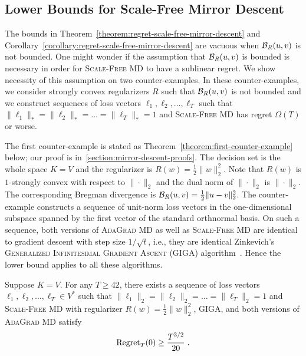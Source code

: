 \subsection{Lower Bounds for Scale-Free Mirror Descent}
\label{subsection:mirror-descent-lower-bound}

The bounds in Theorem~\ref{theorem:regret-scale-free-mirror-descent} and
Corollary~\ref{corollary:regret-scale-free-mirror-descent} are vacuous when
$\mathcal{B}_R(u,v)$ is not bounded. One might wonder if the assumption that
$\mathcal{B}_R(u,v)$ is bounded is necessary in order for \textsc{Scale-Free MD} to
have a sublinear regret. We show necessity of this assumption on two
counter-examples.  In these counter-examples, we consider strongly convex
regularizers $R$ such that $\mathcal{B}_R(u,v)$ is not bounded and we construct
sequences of loss vectors $\ell_1, \ell_2, \dots, \ell_T$ such that
$\|\ell_1\|_* = \|\ell_2\|_* = \dots = \|\ell_T\|_* = 1$ and \textsc{Scale-Free
MD} has regret $\Omega(T)$ or worse.

The first counter-example is stated as
Theorem~\ref{theorem:first-counter-example} below; our proof is
in~\ref{section:mirror-descent-proofs}. The decision set is the whole space
$K=V$ and the regularizer is $R(w) = \frac{1}{2}\|w\|_2^2$. Note that $R(w)$ is
$1$-strongly convex with respect to $\|\cdot\|_2$ and the dual norm of
$\|\cdot\|_2$ is $\|\cdot\|_2$. The corresponding Bregman divergence is
$\mathcal{B}_R(u,v) = \frac{1}{2}\|u-v\|_2^2$. The counter-example constructs a
sequence of unit-norm loss vectors in the one-dimensional subspace spanned by
the first vector of the standard orthnormal basis.  On such a sequence, both
versions of \textsc{AdaGrad MD} as well as  \textsc{Scale-Free MD} are identical
to gradient descent with step size $1/\sqrt{t}$, i.e., they are identical
Zinkevich's \textsc{Generalized Infinitesimal Gradient Ascent} (\textsc{GIGA})
algorithm~\cite{Zinkevich-2003}. Hence the lower bound applies to all these
algorithms.

\begin{theorem}
\label{theorem:first-counter-example}
Suppose $K = V$. For any $T \ge 42$, there exists a sequence of loss vectors
$\ell_1, \ell_2, \dots, \ell_T \in V^*$ such that $\|\ell_1\|_2 = \|\ell_2\|_2
= \dots = \|\ell_T\|_2 = 1$ and \textsc{Scale-Free MD} with
regularizer $R(w) = \frac{1}{2}\|w\|_2^2$, \textsc{GIGA},
and both versions of \textsc{AdaGrad MD} satisfy
$$
\operatorname{Regret}_T(0) \ge \frac{T^{3/2}}{20} \; .
$$
\end{theorem}

